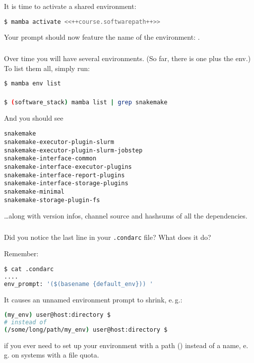 \begin{frame}[fragile]
	\frametitle{}
	It is time to activate a shared environment:
	\begin{lstlisting}[language=Bash, style=Shell]
		$ mamba activate <<++course.softwarepath++>>
	\end{lstlisting}
	Your prompt should now feature the name of the environment: .
\end{frame}

\begin{frame}[fragile]
	\frametitle{}
	Over time you will have several environments. (So far, there is one plus the  env.) To list them all, simply run:
	\begin{lstlisting}[language=Bash, style=Shell]
$ mamba env list
	\end{lstlisting}
\end{frame}

\begin{frame}[fragile]
    \frametitle{}
    \begin{lstlisting}[language=Bash, style=Shell]
$ (software_stack) mamba list | grep snakemake
    \end{lstlisting}
     And you should see
     \begin{lstlisting}[style=Plain]
snakemake
snakemake-executor-plugin-slurm
snakemake-executor-plugin-slurm-jobstep
snakemake-interface-common
snakemake-interface-executor-plugins
snakemake-interface-report-plugins
snakemake-interface-storage-plugins
snakemake-minimal
snakemake-storage-plugin-fs
     \end{lstlisting}
     \ldots along with version infos, channel source and hashsums of all the dependencies.
\end{frame}

\begin{frame}[fragile]
   \frametitle{}
   \begin{question}
   	Did you notice the last line in your \texttt{.condarc} file? What does it do?
   \end{question} 
   Remember:
     \begin{lstlisting}[language=Bash, style=Shell]
$ cat .condarc
....
env_prompt: '($(basename {default_env})) '
   \end{lstlisting}
   \pause
   It causes an unnamed environment prompt to shrink, e.\,g.:
   \begin{lstlisting}[language=Bash, style=Plain]
(my_env) user@host:directory $
# instead of
(/some/long/path/my_env) user@host:directory $
   \end{lstlisting}
   if you ever need to set up your environment with a path () instead of a name, e.\,g. on systems with a file quota.
\end{frame}



